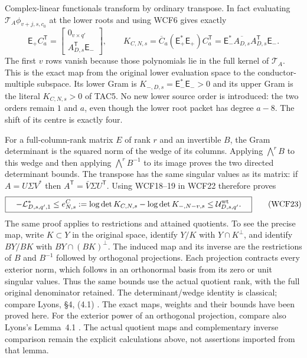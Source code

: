 \documentclass[11pt,a4paper]{article}
\begin{document}
Complex-linear functionals transform by ordinary transpose. In fact
evaluating $\mathcal T_A\phi_{v+j,s,c_0}$ at the lower roots and using
WCF6 gives exactly
\[
 \boxed{\quad \mathsf E_+ C_a^{\mathsf T}
       =\begin{bmatrix}0_{v\times q'}\\ A_{D,s}^{\mathsf T}\mathsf E_-\end{bmatrix},
 \qquad
 K_{C,N,s}=\overline C_a(\mathsf E_+^*\mathsf E_+)C_a^{\mathsf T}
       =\mathsf E_-^*\overline{A_{D,s}}A_{D,s}^{\mathsf T}\mathsf E_-.
 \quad}\tag{WCF22}
\]
The first $v$ rows vanish because those polynomials lie in the full
kernel of $\mathcal T_A$. This is the exact map from the original
lower evaluation space to the conductor-multiple subspace. Its lower
Gram is $K_{-,D,s}=\mathsf E_-^*\mathsf E_->0$ and its upper Gram
is the literal $K_{C,N,s}>0$ of TAC5. No new lower source order is
introduced: the two orders remain $1$ and $a$, even though the lower
root packet has degree $a-8$. The shift of its centre is exactly four.

For a full-column-rank matrix $E$ of rank $r$ and an invertible $B$,
the Gram determinant is the squared norm of the wedge of its columns.
Applying $\bigwedge^r B$ to this wedge and then applying
$\bigwedge^rB^{-1}$ to its image proves the two directed determinant
bounds. The transpose has the same singular values as its matrix:
if $A=U\Sigma V^*$ then $A^{\mathsf T}=\bar V\Sigma U^{\mathsf T}$.
Using WCF18--19 in WCF22 therefore proves
\[
 \boxed{\quad
 -\mathcal L_{D,s,q',1}^*
 \le e_{N,s}^{C}:=\log\det K_{C,N,s}-\log\det K_{-,N-v,s}
 \le\mathcal U^{\rm wt}_{D,s,q'}.
 \quad}\tag{WCF23}
\]
The same proof applies to restrictions and attained quotients. To see
the precise map, write $K\subset Y$ in the original space, identify
$Y/K$ with $Y\cap K^\perp$, and identify $BY/BK$ with
$BY\cap(BK)^\perp$. The induced map and its inverse are the
restrictions of $B$ and $B^{-1}$ followed by orthogonal projections.
Each projection contracts every exterior norm, which follows in an
orthonormal basis from its zero or unit singular values. Thus the
same bounds use the actual quotient rank, with the full original
denominator retained. The determinant/wedge identity is classical;
compare Lyons, \S4, (4.1) \cite{human:lyons2003}. The exact maps,
weights and their bounds have been proved here.
For the exterior power of an orthogonal projection, compare also
Lyons's Lemma~4.1 \cite[\S4, Lemma~4.1, preprint p.~12]{human:lyons2003}.
The actual quotient maps and complementary inverse comparison remain
the explicit calculations above, not assertions imported from that lemma.
\end{document}
